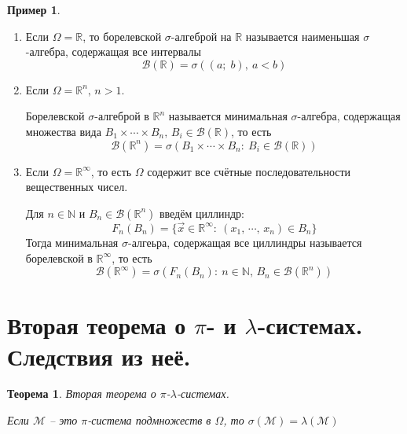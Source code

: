 \documentclass[a4paper,12pt]{article}
\theoremstyle{plain}
\newtheorem{theorem}{Теорема}[section]
\theoremstyle{definition}
\newtheorem*{example}{Пример}
\theoremstyle{remark}
\begin{document}
\begin{example}
	\begin{enumerate}
		\item Если $\Omega = \mathbb{R}$, то борелевской $\sigma$-алгеброй на $\mathbb{R}$ называется наименьшая $\sigma$-алгебра, содержащая все интервалы
		      \[\mathcal{B}(\mathbb{R}) = \sigma((a;\;b) ,\: a < b)\]
		\item Если $\Omega = \mathbb{R}^n,\, n > 1$.

		      Борелевской $\sigma$-алгеброй в $\mathbb{R}^n$ называется минимальная $\sigma$-алгебра, содержащая множества вида $B_1 \times \cdots \times B_n,\, B_i \in \mathcal{B}(\mathbb{R})$, то есть
		      \[\mathcal{B}(\mathbb{R}^n) = \sigma(B_1 \times \cdots \times B_n:\: B_i \in \mathcal{B}(\mathbb{R}))\]
		\item Если $\Omega = \mathbb{R}^\infty$, то есть $\Omega$ содержит все счётные последовательности вещественных чисел.

		      Для $n \in \mathbb{N}$ и $B_n \in \mathcal{B}(\mathbb{R}^n)$ введём циллиндр:
		      \[F_n(B_n) = \{\vec{x} \in \mathbb{R}^\infty :\: (x_1,\,\cdots,\,x_n) \in B_n\}\]
		      Тогда минимальная $\sigma$-алгеьра, содержащая все циллиндры называется борелевской в $\mathbb{R}^\infty$, то есть
		      \[\mathcal{B}(\mathbb{R}^\infty) = \sigma(F_n(B_n):\: n \in \mathbb{N},\, B_n \in \mathcal{B}(\mathbb{R}^n))\]
	\end{enumerate}
\end{example}

\section{Вторая теорема о $\pi$- и $\lambda$-системах. Следствия из неё.}
\begin{theorem} \label{SECOND_SYSTEM_TH}
	Вторая теорема о $\pi$-$\lambda$-системах.

	Если $\mathcal{M}$ -- это $\pi$-система подмножеств в $\Omega$, то $\sigma(\mathcal{M}) = \lambda(\mathcal{M})$
\end{theorem}
\end{document}
